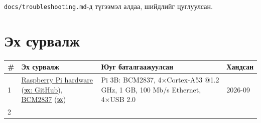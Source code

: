\texttt{docs/\allowbreak{}troubleshooting.\allowbreak{}md}-д түгээмэл алдаа, шийдлийг цуглуулсан.

\hypertarget{ux44dux445-ux441ux443ux440ux432ux430ux43bux436}{%
\section{Эх сурвалж}\label{ux44dux445-ux441ux443ux440ux432ux430ux43bux436}}

\begingroup\scriptsize\begin{longtable}[]{@{}llll@{}}
\toprule
\begin{minipage}[b]{0.22\columnwidth}\raggedright
\#\strut
\end{minipage} & \begin{minipage}[b]{0.22\columnwidth}\raggedright
Эх сурвалж\strut
\end{minipage} & \begin{minipage}[b]{0.22\columnwidth}\raggedright
Юуг баталгаажуулсан\strut
\end{minipage} & \begin{minipage}[b]{0.22\columnwidth}\raggedright
Хандсан\strut
\end{minipage}\tabularnewline
\midrule
\endhead
\begin{minipage}[t]{0.22\columnwidth}\raggedright
1\strut
\end{minipage} & \begin{minipage}[t]{0.22\columnwidth}\raggedright
\href{https://www.raspberrypi.com/documentation/computers/raspberry-pi.html}{Raspberry Pi hardware} (\href{https://github.com/raspberrypi/documentation/blob/develop/documentation/asciidoc/computers/raspberry-pi/introduction.adoc}{эх: GitHub}), \href{https://www.raspberrypi.com/documentation/computers/processors.html\#bcm2837}{BCM2837} (\href{https://github.com/raspberrypi/documentation/blob/develop/documentation/asciidoc/computers/processors/bcm2837.adoc}{эх})\strut
\end{minipage} & \begin{minipage}[t]{0.22\columnwidth}\raggedright
Pi 3B: BCM2837, 4×Cortex-A53 @1.2 GHz, 1 GB, 100 Mb/s Ethernet, 4×USB 2.0\strut
\end{minipage} & \begin{minipage}[t]{0.22\columnwidth}\raggedright
2026-09\strut
\end{minipage}\tabularnewline
\begin{minipage}[t]{0.22\columnwidth}\raggedright
2\strut
\end{minipage} & \begin{minipage}[t]{0.22\columnwidth}\raggedright

\end{minipage}
\end{longtable}
